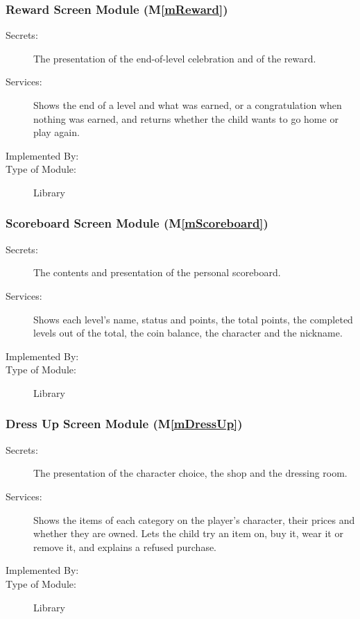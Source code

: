 \documentclass[10pt, titlepage]{article}
\newcommand{\mplainref}[1]{M\ref*{#1}}
\begin{document}
\subsubsection{Reward Screen Module (\mplainref{mReward})}\label{md:mReward}

\begin{description}
\item[Secrets:] The presentation of the end-of-level celebration and of the
  reward.
\item[Services:] Shows the end of a level and what was earned, or a
  congratulation when nothing was earned, and returns whether the child wants
  to go home or play again.
\item[Implemented By:] \progname{}
\item[Type of Module:] Library
\end{description}

\subsubsection{Scoreboard Screen Module (\mplainref{mScoreboard})}\label{md:mScoreboard}

\begin{description}
\item[Secrets:] The contents and presentation of the personal scoreboard.
\item[Services:] Shows each level's name, status and points, the total points,
  the completed levels out of the total, the coin balance, the character and
  the nickname.
\item[Implemented By:] \progname{}
\item[Type of Module:] Library
\end{description}

\subsubsection{Dress Up Screen Module (\mplainref{mDressUp})}\label{md:mDressUp}

\begin{description}
\item[Secrets:] The presentation of the character choice, the shop and the
  dressing room.
\item[Services:] Shows the items of each category on the player's character,
  their prices and whether they are owned. Lets the child try an item on, buy
  it, wear it or remove it, and explains a refused purchase.
\item[Implemented By:] \progname{}
\item[Type of Module:] Library
\end{description}
\end{document}

